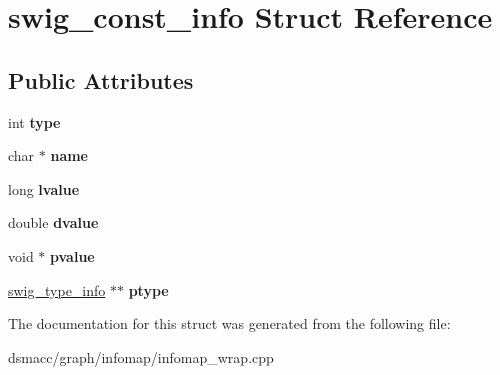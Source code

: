 \hypertarget{structswig__const__info}{}\section{swig\+\_\+const\+\_\+info Struct Reference}
\label{structswig__const__info}
\subsection*{Public Attributes}
\begin{DoxyCompactItemize}
\item 
\mbox{\label{structswig__const__info_ae8bbc99e1cda11f24e306365cbf33893}} 
int {\bfseries type}
\item 
\mbox{\label{structswig__const__info_aad383d74116313cf9a8532e163368050}} 
char $\ast$ {\bfseries name}
\item 
\mbox{\label{structswig__const__info_af142e4c21ad4fe61f6c2624bff034583}} 
long {\bfseries lvalue}
\item 
\mbox{\label{structswig__const__info_a74e477f1dbf515bcb7e2ef07a1d34c35}} 
double {\bfseries dvalue}
\item 
\mbox{\label{structswig__const__info_abbc43512c364bff11fac5961c1155090}} 
void $\ast$ {\bfseries pvalue}
\item 
\mbox{\label{structswig__const__info_aedd46d173c5b5ed4ee60ad5660233557}} 
\mbox{\hyperlink{structswig__type__info}{swig\+\_\+type\+\_\+info}} $\ast$$\ast$ {\bfseries ptype}
\end{DoxyCompactItemize}


The documentation for this struct was generated from the following file\+:\begin{DoxyCompactItemize}
\item 
dsmacc/graph/infomap/infomap\+\_\+wrap.\+cpp\end{DoxyCompactItemize}
